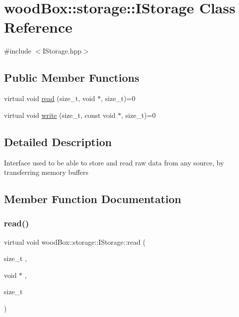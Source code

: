\hypertarget{classwood_box_1_1storage_1_1_i_storage}{}\section{wood\+Box\+:\+:storage\+:\+:I\+Storage Class Reference}
\label{classwood_box_1_1storage_1_1_i_storage}


{\ttfamily \#include $<$I\+Storage.\+hpp$>$}

\subsection*{Public Member Functions}
\begin{DoxyCompactItemize}
\item 
virtual void \mbox{\hyperlink{classwood_box_1_1storage_1_1_i_storage_a01bab924be0844e3866b27279caa506d}{read}} (size\+\_\+t, void $\ast$, size\+\_\+t)=0
\item 
virtual void \mbox{\hyperlink{classwood_box_1_1storage_1_1_i_storage_a5eb82c922e8a3147ddab510706be8e24}{write}} (size\+\_\+t, const void $\ast$, size\+\_\+t)=0
\end{DoxyCompactItemize}


\subsection{Detailed Description}
Interface used to be able to store and read raw data from any source, by transferring memory buffers 

\subsection{Member Function Documentation}
\mbox{\label{classwood_box_1_1storage_1_1_i_storage_a01bab924be0844e3866b27279caa506d}} 
\subsubsection{\texorpdfstring{read()}{read()}}
{\footnotesize\ttfamily virtual void wood\+Box\+::storage\+::\+I\+Storage\+::read (\begin{DoxyParamCaption}\item[{size\+\_\+t}]{,  }\item[{void $\ast$}]{,  }\item[{size\+\_\+t}]{ }\end{DoxyParamCaption})\hspace{0.3cm}{\ttfamily [pure virtual]}}

